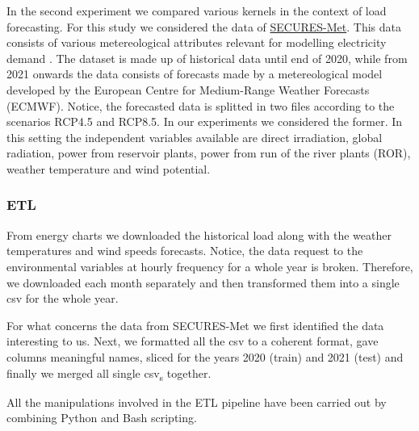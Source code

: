 In the second experiment we compared various kernels in the context of load forecasting.
For this study we considered the data of \href{https://zenodo.org/records/7907883}{SECURES-Met}. This data consists of various metereological attributes relevant for modelling electricity demand \cite{Formayer2023}. The dataset is made up of historical data until end of 2020, while from 2021 onwards the data consists of forecasts made by a metereological model developed by the European Centre for Medium-Range Weather Forecasts (ECMWF). Notice, the forecasted data is splitted in two files according to the scenarios RCP4.5 and RCP8.5. In our experiments we considered the former. 
In this setting the independent variables available are 
direct irradiation, global radiation, power from reservoir plants, power from run of the river plants (ROR), weather temperature and wind potential.

\subsubsection{ETL}
From energy charts we downloaded the historical load along with the weather temperatures and wind speeds forecasts. Notice, the data request to the environmental variables at hourly frequency for a whole year is broken. Therefore, we downloaded each month separately and then transformed them into a single csv for the whole year.

For what concerns the data from SECURES-Met we first identified the data interesting to us. Next, we formatted all the csv to a coherent format, gave columns meaningful names, sliced for the years 2020 (train) and 2021 (test) and finally we merged all single csv\textsubscript{s} together.

All the manipulations involved in the ETL pipeline have been carried out by combining Python and Bash scripting. 

